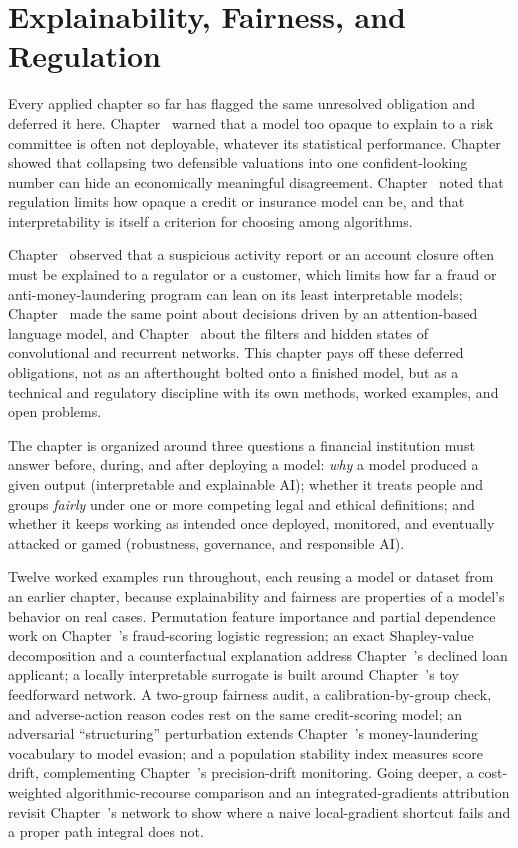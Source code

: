 \documentclass[../ai_in_finance]{subfiles}
\begin{document}
\chapter{Explainability, Fairness, and Regulation}

Every applied chapter so far has flagged the same unresolved obligation and deferred it here. Chapter~ warned that a model too opaque to explain to a risk committee is often not deployable, whatever its statistical performance. Chapter~ showed that collapsing two defensible valuations into one confident-looking number can hide an economically meaningful disagreement. Chapter~ noted that regulation limits how opaque a credit or insurance model can be, and that interpretability is itself a criterion for choosing among algorithms.

Chapter~ observed that a suspicious activity report or an account closure often must be explained to a regulator or a customer, which limits how far a fraud or anti-money-laundering program can lean on its least interpretable models; Chapter~ made the same point about decisions driven by an attention-based language model, and Chapter~ about the filters and hidden states of convolutional and recurrent networks. This chapter pays off these deferred obligations, not as an afterthought bolted onto a finished model, but as a technical and regulatory discipline with its own methods, worked examples, and open problems.

The chapter is organized around three questions a financial institution must answer before, during, and after deploying a model: \emph{why} a model produced a given output (interpretable and explainable AI); whether it treats people and groups \emph{fairly} under one or more competing legal and ethical definitions; and whether it keeps working as intended once deployed, monitored, and eventually attacked or gamed (robustness, governance, and responsible AI).

Twelve worked examples run throughout, each reusing a model or dataset from an earlier chapter, because explainability and fairness are properties of a model's behavior on real cases. Permutation feature importance and partial dependence work on Chapter~'s fraud-scoring logistic regression; an exact Shapley-value decomposition and a counterfactual explanation address Chapter~'s declined loan applicant; a locally interpretable surrogate is built around Chapter~'s toy feedforward network. A two-group fairness audit, a calibration-by-group check, and adverse-action reason codes rest on the same credit-scoring model; an adversarial ``structuring'' perturbation extends Chapter~'s money-laundering vocabulary to model evasion; and a population stability index measures score drift, complementing Chapter~'s precision-drift monitoring. Going deeper, a cost-weighted algorithmic-recourse comparison and an integrated-gradients attribution revisit Chapter~'s network to show where a naive local-gradient shortcut fails and a proper path integral does not.
\end{document}
